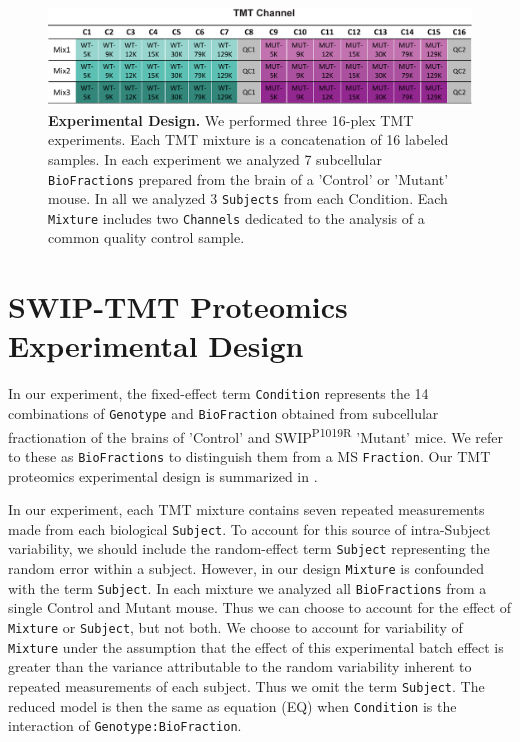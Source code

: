 \documentclass[11pt]{elife}\usepackage[]{graphicx}\usepackage[]{color}
\begin{document}
\begin{figure}[ht!] %
  \begin{fullwidth}
  \begin{center}
	  \includegraphics[width=0.9\paperwidth,keepaspectratio]{design}
	  \caption{\textbf{Experimental Design.} We performed three 16-plex TMT
	  experiments. Each TMT mixture is a concatenation of 16 labeled
	  samples. In each experiment we analyzed 7 subcellular
	  \texttt{BioFractions} prepared from the brain of a 'Control' or
	  'Mutant' mouse. In all we analyzed 3 \texttt{Subjects} from each 
	  {Condition}. Each \texttt{Mixture} includes two \texttt{Channels}
	  dedicated to the analysis of a common quality control sample.}
	  \label{fig:design}
  \end{center}
  \end{fullwidth}
\end{figure}


\section{SWIP-TMT Proteomics Experimental Design}

In our experiment, the fixed-effect term \texttt{Condition} represents the 14
combinations of \texttt{Genotype} and \texttt{BioFraction} obtained from 
subcellular fractionation of the brains of 'Control' and 
SWIP\textsuperscript{P1019R} 'Mutant' mice. We refer to these as
\texttt{BioFractions} to distinguish them from a MS \texttt{Fraction}. 
Our TMT proteomics experimental design is summarized in .

In our experiment, each TMT mixture contains seven repeated measurements
made from each biological \texttt{Subject}. To account for this source of
intra-Subject variability, we should include the random-effect term
\texttt{Subject} representing the random error within a subject. However, in our
design \texttt{Mixture} is confounded with the term \texttt{Subject}. In
each mixture we analyzed all \texttt{BioFractions} from a single Control and
Mutant mouse.  Thus we can choose to account for the effect of \texttt{Mixture}
or \texttt{Subject}, but not both. We choose to account for variability of 
\texttt{Mixture} under the assumption that the effect of this experimental batch 
effect is greater than the variance attributable to the random variability
inherent to repeated measurements of each subject. 
Thus we omit the term \texttt{Subject}. The reduced model is then the same as
equation (EQ) when \texttt{Condition} is the interaction of 
\texttt{Genotype:BioFraction}.\\
\end{document}
